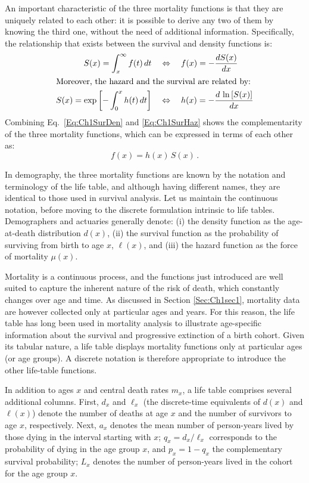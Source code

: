 \documentclass[Thesis]{subfiles}
\begin{document}
An important characteristic of the three mortality functions is that they are uniquely related to each other: it is possible to derive any two of them by knowing the third one, without the need of additional information. Specifically, the relationship that exists between the survival and density functions is:
%  
\begin{align}
	S(x) = \int_{x}^{\infty} f(t)\,dt \quad &\Leftrightarrow \quad f(x) = - \frac{dS(x)}{dx} \label{Eq:Ch1SurDen} \\
	\intertext{Moreover, the hazard and the survival are related by:}
	S(x) = \exp \left[-\int_{0}^{x} h(t)\,dt \right] \quad &\Leftrightarrow \quad h(x) = - \frac{d\,\ln \left[S(x)\right]}{dx} \label{Eq:Ch1SurHaz}
\end{align}
%
Combining Eq.~\eqref{Eq:Ch1SurDen} and \eqref{Eq:Ch1SurHaz} shows the complementarity of the three mortality functions, which can be expressed in terms of each other as:
%  
\begin{equation}\label{Eq:Ch1DenHazSur}
f(x) = h(x)\,S(x) \, .
\end{equation}
%

In demography, the three mortality functions are known by the notation and terminology of the life table, and although having different names, they are identical to those used in survival analysis. Let us maintain the continuous notation, before moving to the discrete formulation intrinsic to life tables. Demographers and actuaries generally denote: (i) the density function as the age-at-death distribution $d(x)$, (ii) the survival function as the probability of surviving from birth to age $x$, $\ell(x)$, and (iii) the hazard function as the force of mortality $\mu(x)$.  

Mortality is a continuous process, and the functions just introduced are well suited to capture the inherent nature of the risk of death, which constantly changes over age and time. As discussed in Section \ref{Sec:Ch1sec1}, mortality data are however collected only at particular ages and years. For this reason, the life table has long been used in mortality analysis to illustrate age-specific information about the survival and progressive extinction of a birth cohort. Given its tabular nature, a life table displays mortality functions only at particular ages (or age groups). A discrete notation is therefore appropriate to introduce the other life-table functions. 

In addition to ages $x$ and central death rates $m_x$, a life table comprises several additional columns. First, $d_x$ and $\ell_x$ (the discrete-time equivalents of $d(x)$ and $\ell(x)$) denote the number of deaths at age $x$ and the number of survivors to age $x$, respectively. Next, $a_x$ denotes the mean number of person-years lived by those dying in the interval starting with $x$; $q_x = d_x / \ell_x$ corresponds to the probability of dying in the age group $x$, and $p_x = 1 - q_x$ the complementary survival probability; $L_x$ denotes the number of person-years lived in the cohort for the age group $x$.  
\end{document}
